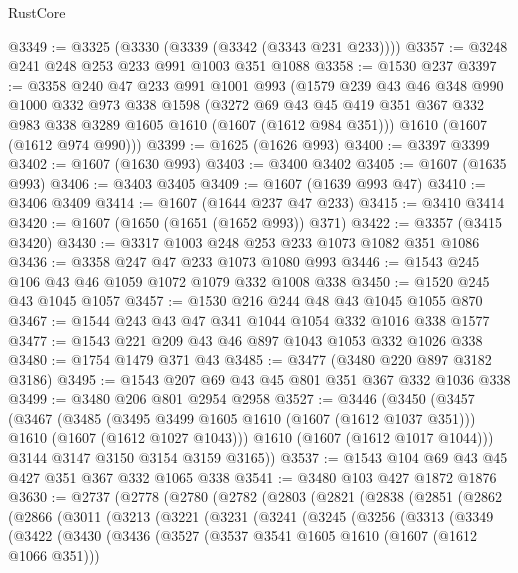 \begin{lexlean}{RustCore}
\begin{coremodule}
@3349 := @3325 (@3330 (@3339 (@3342 (@3343 @231 @233))))
@3357 := @3248 @241 @248 @253 @233 @991 @1003 @351 @1088
@3358 := @1530 @237
@3397 := @3358
    @240
    @47
    @233
    @991
    @1001
    @993
    (@1579
      @239
      @43
      @46
      @348
      @990
      @1000
      @332
      @973
      @338
      @1598
      (@3272 @69 @43 @45 @419 @351 @367 @332 @983 @338 @3289 @1605 @1610 (@1607 (@1612 @984 @351)))
      @1610
      (@1607 (@1612 @974 @990)))
@3399 := @1625 (@1626 @993)
@3400 := @3397 @3399
@3402 := @1607 (@1630 @993)
@3403 := @3400 @3402
@3405 := @1607 (@1635 @993)
@3406 := @3403 @3405
@3409 := @1607 (@1639 @993 @47)
@3410 := @3406 @3409
@3414 := @1607 (@1644 @237 @47 @233)
@3415 := @3410 @3414
@3420 := @1607 (@1650 (@1651 (@1652 @993)) @371)
@3422 := @3357 (@3415 @3420)
@3430 := @3317 @1003 @248 @253 @233 @1073 @1082 @351 @1086
@3436 := @3358 @247 @47 @233 @1073 @1080 @993
@3446 := @1543 @245 @106 @43 @46 @1059 @1072 @1079 @332 @1008 @338
@3450 := @1520 @245 @43 @1045 @1057
@3457 := @1530 @216 @244 @48 @43 @1045 @1055 @870
@3467 := @1544 @243 @43 @47 @341 @1044 @1054 @332 @1016 @338 @1577
@3477 := @1543 @221 @209 @43 @46 @897 @1043 @1053 @332 @1026 @338
@3480 := @1754 @1479 @371 @43
@3485 := @3477 (@3480 @220 @897 @3182 @3186)
@3495 := @1543 @207 @69 @43 @45 @801 @351 @367 @332 @1036 @338
@3499 := @3480 @206 @801 @2954 @2958
@3527 := @3446
    (@3450
      (@3457
        (@3467
          (@3485
            (@3495 @3499 @1605 @1610 (@1607 (@1612 @1037 @351)))
            @1610
            (@1607 (@1612 @1027 @1043)))
          @1610
          (@1607 (@1612 @1017 @1044)))
        @3144
        @3147
        @3150
        @3154
        @3159
        @3165))
@3537 := @1543 @104 @69 @43 @45 @427 @351 @367 @332 @1065 @338
@3541 := @3480 @103 @427 @1872 @1876
@3630 := @2737
    (@2778
      (@2780
        (@2782
          (@2803
            (@2821
              (@2838
                (@2851
                  (@2862
                    (@2866
                      (@3011
                        (@3213
                          (@3221
                            (@3231
                              (@3241
                                (@3245
                                  (@3256
                                    (@3313
                                      (@3349
                                        (@3422
                                          (@3430
                                            (@3436
                                              (@3527
                                                (@3537 @3541 @1605 @1610 (@1607 (@1612 @1066 @351)))

\end{coremodule}
\end{lexlean}
